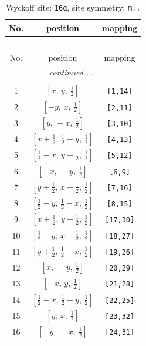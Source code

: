 \documentclass[fleqn,8pt]{jsarticle}
\begin{document}
\renewcommand{\arraystretch}{1.2}
\begin{longtable}{ccc}
\caption{Wyckoff site: {\tt 16q}, site symmetry: {\tt m..}}
 \\
 \hline \hline
No. & position & mapping \\ \hline \endfirsthead

\multicolumn{2}{l}{\tablename\ \thetable{}} \\
 \hline \hline
No. & position & mapping \\ \hline \endhead

 \hline \hline
\multicolumn{2}{r}{\footnotesize\it continued ...} \\ \endfoot

 \hline \hline
\multicolumn{2}{r}{} \\ \endlastfoot

1 & $\left[ x,\, y,\, \frac{1}{2} \right]$ & {\tt [1,14]} \\ \hline
2 & $\left[ - y,\, x,\, \frac{1}{2} \right]$ & {\tt [2,11]} \\ \hline
3 & $\left[ y,\, - x,\, \frac{1}{2} \right]$ & {\tt [3,10]} \\ \hline
4 & $\left[ x + \frac{1}{2},\, \frac{1}{2} - y,\, \frac{1}{2} \right]$ & {\tt [4,13]} \\ \hline
5 & $\left[ \frac{1}{2} - x,\, y + \frac{1}{2},\, \frac{1}{2} \right]$ & {\tt [5,12]} \\ \hline
6 & $\left[ - x,\, - y,\, \frac{1}{2} \right]$ & {\tt [6,9]} \\ \hline
7 & $\left[ y + \frac{1}{2},\, x + \frac{1}{2},\, \frac{1}{2} \right]$ & {\tt [7,16]} \\ \hline
8 & $\left[ \frac{1}{2} - y,\, \frac{1}{2} - x,\, \frac{1}{2} \right]$ & {\tt [8,15]} \\ \hline
9 & $\left[ x + \frac{1}{2},\, y + \frac{1}{2},\, \frac{1}{2} \right]$ & {\tt [17,30]} \\ \hline
10 & $\left[ \frac{1}{2} - y,\, x + \frac{1}{2},\, \frac{1}{2} \right]$ & {\tt [18,27]} \\ \hline
11 & $\left[ y + \frac{1}{2},\, \frac{1}{2} - x,\, \frac{1}{2} \right]$ & {\tt [19,26]} \\ \hline
12 & $\left[ x,\, - y,\, \frac{1}{2} \right]$ & {\tt [20,29]} \\ \hline
13 & $\left[ - x,\, y,\, \frac{1}{2} \right]$ & {\tt [21,28]} \\ \hline
14 & $\left[ \frac{1}{2} - x,\, \frac{1}{2} - y,\, \frac{1}{2} \right]$ & {\tt [22,25]} \\ \hline
15 & $\left[ y,\, x,\, \frac{1}{2} \right]$ & {\tt [23,32]} \\ \hline
16 & $\left[ - y,\, - x,\, \frac{1}{2} \right]$ & {\tt [24,31]} \\
\end{longtable}
\end{document}
